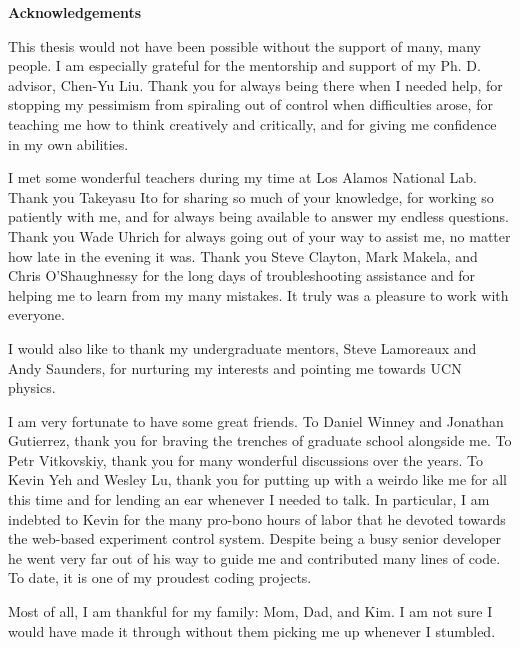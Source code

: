 \begin{centering}
\textbf{Acknowledgements} \par
\vspace{\baselineskip}
\end{centering}


This thesis would not have been possible without the support of many, many people. I am especially grateful for the mentorship and support of my Ph. D. advisor, Chen-Yu Liu. Thank you for always being there when I needed help, for stopping my pessimism from spiraling out of control when difficulties arose, for teaching me how to think creatively and critically, and for giving me confidence in my own abilities.

I met some wonderful teachers during my time at Los Alamos National Lab. Thank you Takeyasu Ito for sharing so much of your knowledge, for working so patiently with me, and for always being available to answer my endless questions. Thank you Wade Uhrich for always going out of your way to assist me, no matter how late in the evening it was. Thank you Steve Clayton, Mark Makela, and Chris O'Shaughnessy for the long days of troubleshooting assistance and for helping me to learn from my many mistakes. It truly was a pleasure to work with everyone.

I would also like to thank my undergraduate mentors, Steve Lamoreaux and Andy Saunders, for nurturing my interests and pointing me towards UCN physics.

I am very fortunate to have some great friends. To Daniel Winney and Jonathan Gutierrez, thank you for braving the trenches of graduate school alongside me. To Petr Vitkovskiy, thank you for many wonderful discussions over the years. To Kevin Yeh and Wesley Lu, thank you for putting up with a weirdo like me for all this time and for lending an ear whenever I needed to talk. In particular, I am indebted to Kevin for the many pro-bono hours of labor that he devoted towards the web-based experiment control system. Despite being a busy senior developer he went very far out of his way to guide me and contributed many lines of code. To date, it is one of my proudest coding projects.

Most of all, I am thankful for my family: Mom, Dad, and Kim. I am not sure I would have made it through without them picking me up whenever I stumbled.




